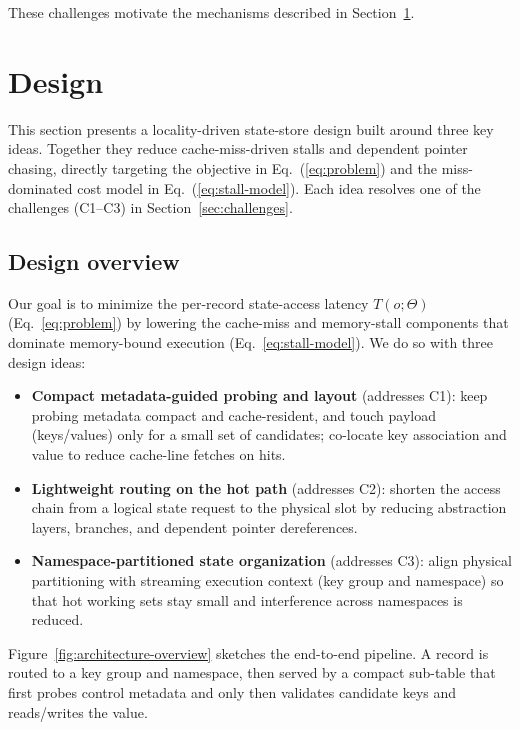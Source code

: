 \documentclass[sigconf]{acmart}
\begin{document}
These challenges motivate the mechanisms described in Section~\ref{sec:design}.

\section{Design}
\label{sec:design}
This section presents a locality-driven state-store design built around three key ideas. Together they reduce cache-miss-driven stalls and dependent pointer chasing, directly targeting the objective in Eq.~(\ref{eq:problem}) and the miss-dominated cost model in Eq.~(\ref{eq:stall-model}). Each idea resolves one of the challenges (C1--C3) in Section~\ref{sec:challenges}.

\subsection{Design overview}
Our goal is to minimize the per-record state-access latency $T(o;\Theta)$ (Eq.~\ref{eq:problem}) by lowering the cache-miss and memory-stall components that dominate memory-bound execution (Eq.~\ref{eq:stall-model}). We do so with three design ideas:
\begin{itemize}
  \item \textbf{Compact metadata-guided probing and layout} (addresses C1): keep probing metadata compact and cache-resident, and touch payload (keys/values) only for a small set of candidates; co-locate key association and value to reduce cache-line fetches on hits.
  \item \textbf{Lightweight routing on the hot path} (addresses C2): shorten the access chain from a logical state request to the physical slot by reducing abstraction layers, branches, and dependent pointer dereferences.
  \item \textbf{Namespace-partitioned state organization} (addresses C3): align physical partitioning with streaming execution context (key group and namespace) so that hot working sets stay small and interference across namespaces is reduced.
\end{itemize}

Figure~\ref{fig:architecture-overview} sketches the end-to-end pipeline. A record is routed to a key group and namespace, then served by a compact sub-table that first probes control metadata and only then validates candidate keys and reads/writes the value.
\end{document}
